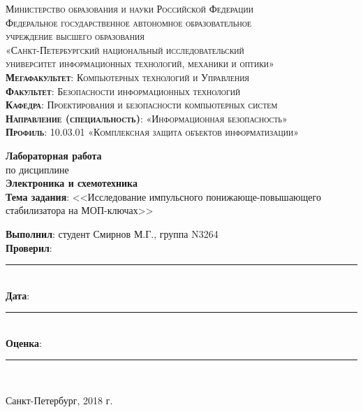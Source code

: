 \begin{titlepage}
	\begin{center}
		\textsc{
			\fontsize{12pt}{14pt}\selectfont
			Министерство образования и науки Российской Федерации\\
			Федеральное государственное автономное образовательное\\
			учреждение высшего образования\\
			«Санкт-Петербургский национальный исследовательский\\
			университет информационных технологий, механики и оптики»\\
			\textbf{Мегафакультет}:  Компьютерных технологий и Управления\\
			\textbf{Факультет}: Безопасности информационных технологий\\
			\textbf{Кафедра}: Проектирования и безопасности компьютерных систем\\
			\textbf{Направление (специальность)}: «Информационная безопасность»\\
			\textbf{Профиль}: 10.03.01 «Комплексная защита объектов информатизации»}
		
		\vfill
		
		\textbf{Лабораторная работа}\\
		по дисциплине\\
		\textbf{Электроника и схемотехника}\\
	\vfill
	\textbf{Тема задания}: <<Исследование импульсного понижающе-повышающего стабилизатора на МОП-ключах>>\\
	\end{center}

	\vfill
	
	\begin{flushright}
	\textbf{Выполнил}: студент Смирнов М.Г., группа N3264\\
	\textbf{Проверил}: \rule{10em}{.1pt}\\
		\vfill
	\textbf{Дата}: \rule{10em}{.1pt}\\
	\textbf{Оценка}: \rule{10em}{.1pt}\\

	\vfill
	


	\end{flushright}
	\vfill
	\begin{center}
		Санкт-Петербург, 2018 г.
	\end{center}
\end{titlepage}
